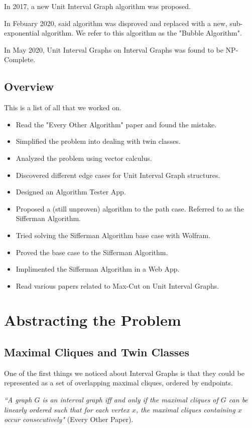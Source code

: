 \documentclass[12pt]{article}
\begin{document}
In 2017, a new Unit Interval Graph algorithm was proposed.

In Febuary 2020, said algorithm was disproved and replaced with a new, sub-exponential algorithm. We refer to this algorithm as the "Bubble Algorithm".

In May 2020, Unit Interval Graphs on Interval Graphs was found to be NP-Complete.

\subsection{Overview}
This is a list of all that we worked on.
\begin{itemize}
    \item Read the "Every Other Algorithm" paper and found the mistake.
    \item Simplified the problem into dealing with twin classes.
    \item Analyzed the problem using vector calculus.
    \item Discovered different edge cases for Unit Interval Graph structures.
    \item Designed an Algorithm Tester App.
    \item Proposed a (still unproven) algorithm to the path case. Referred to as the Sifferman Algorithm.
    \item Tried solving the Sifferman Algorithm base case with Wolfram.
    \item Proved the base case to the Sifferman Algorithm.
    \item Implimented the Sifferman Algorithm in a Web App.
    \item Read various papers related to Max-Cut on Unit Interval Graphs.
\end{itemize}




\section{Abstracting the Problem}
\subsection{Maximal Cliques and Twin Classes}
One of the first things we noticed about Interval Graphs is that they could be represented as a set of overlapping maximal cliques, ordered by endpoints.

\emph{``A graph $G$ is an interval graph iff and only if the maximal cliques of $G$ can be linearly ordered such that for each vertex $x$, the maximal cliques containing $x$ occur consecutively"} (Every Other Paper).
\end{document}
